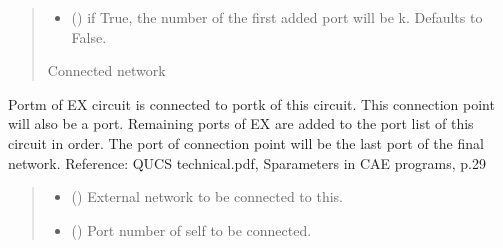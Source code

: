 \documentclass[letterpaper,10pt,english]{sphinxmanual}
\begin{document}
\begin{fulllineitems}
\begin{fulllineitems}
\begin{quote}
\begin{description}
\begin{itemize}
\item {} 
\sphinxAtStartPar
{} (\sphinxstyleliteralemphasis{\sphinxupquote{, }}) \textendash{} if True, the number of the first added port will be k. Defaults to False.

\end{itemize}

\sphinxAtStartPar
Connected network

\sphinxAtStartPar
{\hyperref[\detokenize{touchstone:touchstone.spfile}]{}}

\end{description}\end{quote}

\end{fulllineitems}


\begin{fulllineitems}
\label{\detokenize{touchstone:touchstone.spfile.connect_network_1_conn_retain}}
\pysigstartsignatures
{}
\pysigstopsignatures
\sphinxAtStartPar
Port\sphinxhyphen{}m of EX circuit is connected to port\sphinxhyphen{}k of this circuit. This connection point will also be a port. Remaining ports of EX are added to the port list of this circuit in order. The port of connection point will be the last port of the final network.
Reference: QUCS technical.pdf, S\sphinxhyphen{}parameters in CAE programs, p.29
\begin{quote}\begin{description}
\begin{itemize}
\item {} 
\sphinxAtStartPar
{} ({\hyperref[\detokenize{touchstone:touchstone.spfile}]{}}) \textendash{} External network to be connected to this.

\item {} 
\sphinxAtStartPar
{} () \textendash{} Port number of self to be connected.


\end{itemize}
\end{description}
\end{quote}
\end{fulllineitems}
\end{fulllineitems}
\end{document}
